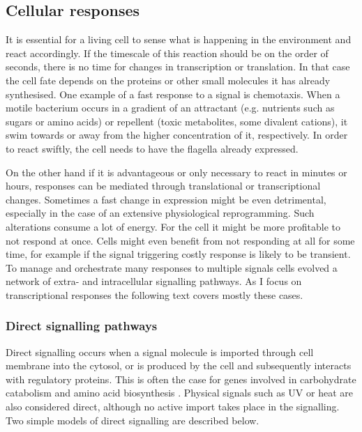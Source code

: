 \subsection{Cellular responses}
It is essential for a living cell to sense what is happening in the environment and react accordingly.
If the timescale of this reaction should be on the order of seconds, there is no time for changes in transcription or translation.
In that case the cell fate depends on the proteins or other small molecules it has already synthesised.
One example of a fast response to a signal is chemotaxis.
When a motile bacterium occurs in a gradient of an attractant (e.g. nutrients such as sugars or amino acids) or repellent (toxic metabolites, some divalent cations), it swim towards or away from the higher concentration of it, respectively.
In order to react swiftly, the cell needs to have the flagella already expressed.

On the other hand if it is advantageous or only necessary to react in minutes or hours, responses can be mediated through translational or transcriptional changes.
Sometimes a fast change in expression might be even detrimental, especially in the case of an extensive physiological reprogramming.
Such alterations consume a lot of energy.
For the cell it might be more profitable to not respond at once.
Cells might even benefit from not responding at all for some time, for example if the signal triggering costly response is likely to be transient.
To manage and orchestrate many responses to multiple signals cells evolved a network of extra- and intracellular signalling pathways.
As I focus on transcriptional responses the following text covers mostly these cases.

\subsubsection{Direct signalling pathways}
Direct signalling occurs when a signal molecule is imported through cell membrane into the cytosol, or is produced by the cell and subsequently interacts with regulatory proteins.
This is often the case for genes involved in carbohydrate catabolism and amino acid biosynthesis \cite{charlier1992arginine, weickert1992isorepressor, pittard1996various, wheatley2013structural}.
Physical signals such as UV or heat are also considered direct, although no active import takes place in the signalling.
Two simple models of direct signalling are described below.

